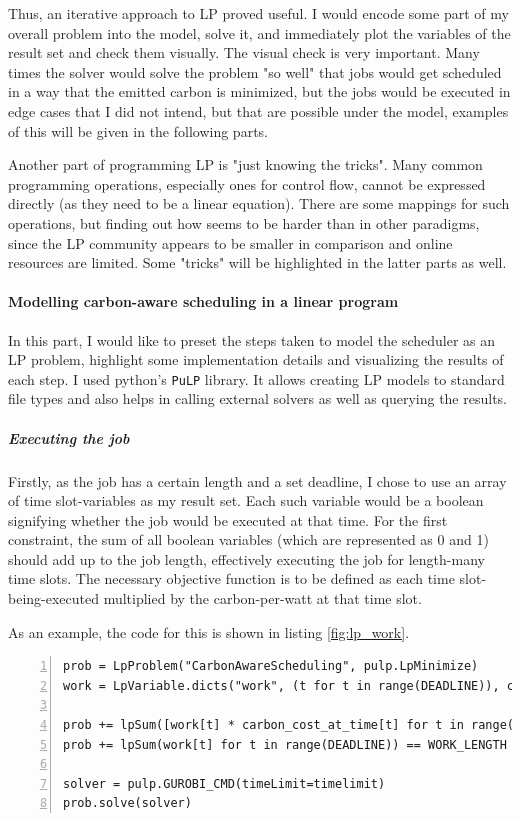 Thus, an iterative approach to LP proved useful. 
I would encode some part of my overall problem into the model, solve it, and immediately plot the variables of the result set and check them visually.
The visual check is very important. 
Many times the solver would solve the problem "so well" that jobs would get scheduled in a way that the emitted carbon is minimized, but the jobs would be executed in edge cases that I did not intend, but that are possible under the model, examples of this will be given in the following parts.

Another part of programming LP is "just knowing the tricks". 
Many common programming operations, especially ones for control flow, cannot be expressed directly (as they need to be a linear equation).
There are some mappings for such operations, but finding out how seems to be harder than in other paradigms, since the LP community appears to be smaller in comparison and online resources are limited.
Some "tricks" will be highlighted in the latter parts as well. 

\paragraph{Modelling carbon-aware scheduling in a linear program}

In this part, I would like to preset the steps taken to model the scheduler as an LP problem, highlight some implementation details and visualizing the results of each step.
I used python's \verb|PuLP| library.
It allows creating LP models to standard file types and also helps in calling external solvers as well as querying the results.

\subparagraph{Executing the job}

Firstly, as the job has a certain length and a set deadline, I chose to use an array of time slot-variables as my result set. Each such variable would be a boolean signifying whether the job would be executed at that time.
For the first constraint, the sum of all boolean variables (which are represented as 0 and 1) should add up to the job length, effectively executing the job for length-many time slots.
The necessary objective function is to be defined as each time slot-being-executed multiplied by the carbon-per-watt at that time slot.

As an example, the code for this is shown in listing \ref{fig:lp_work}.

\begin{lstlisting}[frame=single, numbers=left, caption={LP Implementation for basic scheduling}, label={list:lp_work}, basicstyle=\ttfamily]
prob = LpProblem("CarbonAwareScheduling", pulp.LpMinimize)
work = LpVariable.dicts("work", (t for t in range(DEADLINE)), cat="Binary")

prob += lpSum([work[t] * carbon_cost_at_time[t] for t in range(DEADLINE)]) 
prob += lpSum(work[t] for t in range(DEADLINE)) == WORK_LENGTH

solver = pulp.GUROBI_CMD(timeLimit=timelimit)
prob.solve(solver)
\end{lstlisting}

